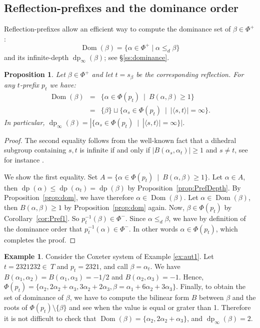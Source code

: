 \documentclass{amsart}
\newtheorem{Proposition}[Theorem]{Proposition}
\theoremstyle{definition}
\newtheorem{Example}[Theorem]{Example}
\newcommand{\dom}{{\operatorname{Dom}}}
\newcommand{\dep}{\operatorname{dp}}
\begin{document}
\subsection{Reflection-prefixes and the dominance order}

Reflection-prefixes allow an efficient way to compute the dominance set of  $\beta\in \Phi^+$: 
$$
\dom(\beta)=\{\alpha \in \Phi^+\mid \alpha\leq_d \beta\}
$$
and its infinite-depth $\dep_\infty(\beta)$; see \S\ref{ss:dominance}.

\begin{Proposition}\label{prop:PrefDom} Let $\beta \in \Phi^+$ and let $t=s_\beta$ be the corresponding reflection. For any $t$-prefix $p_t$ we have:  
\begin{eqnarray*}
\dom(\beta) & = & \{ \alpha\in \Phi(p_t) \ \mid\  B(\alpha,\beta)\geq 1\}\\
&=&\{\beta\}\sqcup \{ \alpha_s\in \Phi(p_t) \ \mid\  |\langle s,t\rangle| =\infty\}.
\end{eqnarray*}
In particular, $\dep_\infty (\beta)=|\{ \alpha_s\in \Phi(p_t) \ \mid\ |\langle s,t\rangle| =\infty\}|$.
\end{Proposition}
%
\begin{proof} The second equality follows from the well-known fact that a dihedral subgroup containing $s,t$ is infinite if and only if $|B(\alpha_s,\alpha_t)|\geq 1$ and $s\not = t$,  see for instance \cite[Proposition 4.5.4]{BB}.   

We show the first equality. Set $A=\{ \alpha\in \Phi(p_t) \ \mid\  B(\alpha,\beta)\geq 1\}$. Let $\alpha\in A$, then $\dep(\alpha)\leq \dep(\alpha_t)=\dep(\beta)$ by Proposition~\ref{prop:PrefDepth}. By Proposition~\ref{prop:dom}, we have therefore $\alpha\in \dom(\beta)$. Let $\alpha\in \dom (\beta)$, then $ B(\alpha,\beta)\geq 1$ by Proposition~\ref{prop:dom} again. Now,  $\beta\in \Phi(p_t)$ by Corollary~\ref{cor:Pref1}. So $p_t^{-1}(\beta)\in \Phi^-$. Since $\alpha\leq_d\beta$, we have by definition of the dominance order that $p_t^{-1}(\alpha)\in \Phi^-$. In other words $\alpha\in \Phi(p_t)$, which completes the proof.
\end{proof}

\begin{Example} Consider the Coxeter system of Example \ref{ex:aut1}. Let $t=2321232\in~T$ and $p_t=2321$, and call $\beta=\alpha_t$. %
We have $B(\alpha_1,\alpha_2)=B(\alpha_1,\alpha_3)=-1/2$ and $B(\alpha_2,\alpha_3)=-1$.  Hence, $\Phi(p_t)=\{\alpha_2, 2\alpha_2+\alpha_3, 3\alpha_2+2\alpha_3, \beta=\alpha_1+6\alpha_2+3\alpha_3\}$. Finally, to obtain the set of dominance of $\beta$, we have to compute the bilinear form $B$ between $\beta$ and the roots of $\Phi(p_t)\setminus\{\beta\}$ and see when the value is equal or grater than 1. Therefore it is not difficult to check that $\dom(\beta)=\{\alpha_2, 2\alpha_2+\alpha_3\}$, and $\dep_\infty(\beta)=2$.  
\end{Example}                                 
\end{document}
